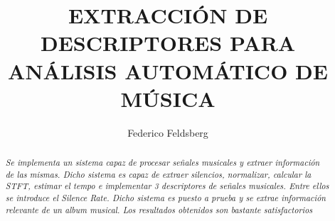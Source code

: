 \documentclass[]{article}
\title{\textbf{\LARGE{\textsf{EXTRACCIÓN DE DESCRIPTORES PARA ANÁLISIS AUTOMÁTICO DE MÚSICA}}}}
\date{} %
\begin{document}


\renewcommand{\headrulewidth}{0pt} %


\author[1]{Federico Feldsberg} %


\begin{minipage}[h]{\textwidth} %
    \maketitle
    \thispagestyle{fancy}
    \fancyhf{}
    \cfoot{\thepage}

\end{minipage}


\begin{abstract}

\textit{Se implementa un sistema capaz de procesar señales musicales y extraer información de las mismas.
Dicho sistema es capaz de extraer silencios, normalizar, calcular la STFT, estimar el tempo e implementar
3 descriptores de señales musicales. Entre ellos se introduce el Silence Rate.
Dicho sistema es puesto a prueba y se extrae información relevante
de un album musical. Los resultados obtenidos son bastante satisfactorios }

\end{abstract}

\vspace{0.8 cm}%
\end{document}
